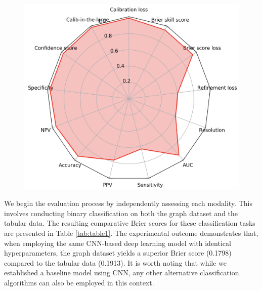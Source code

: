 \begin{figure}[]
\begin{minipage}{0.30\textwidth}
\label{fig:gan5}
\end{minipage}
\hspace{0.5em}
\begin{minipage}{0.35\textwidth}
\centering
\includegraphics[width=\textwidth]{figs/radar.png}
\label{fig:radar}
\end{minipage}
\end{figure}


We begin the evaluation process by independently assessing each modality. This involves conducting binary classification on both the graph dataset and the tabular data. The resulting comparative Brier scores for these classification tasks are presented in Table \ref{tab:table1}. The experimental outcome demonstrates that, when employing the same CNN-based deep learning model with identical hyperparameters, the graph dataset yields a superior Brier score (0.1798) compared to the tabular data (0.1913). It is worth noting that while we established a baseline model using CNN, any other alternative classification algorithms can also be employed in this context.

